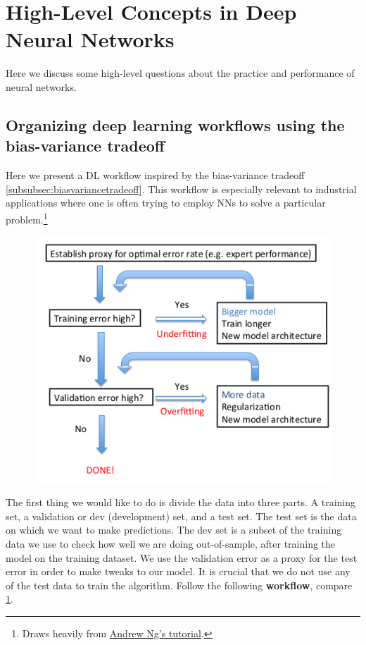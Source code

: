 \section{High-Level Concepts in Deep Neural Networks}
\label{sec:dnn2}
Here we discuss some high-level questions about the practice and performance of neural networks. 


\subsection{Organizing deep learning workflows using the bias-variance tradeoff}
\label{subsec:dnn2Workflow}
Here we present a DL workflow inspired by the bias-variance tradeoff \ref{subsubsec:biasvariancetradeoff}. This workflow is especially relevant to industrial applications where one is often trying to employ NNs to solve a particular problem.\footnote{Draws heavily from \href{https://www.youtube.com/watch?v=F1ka6a13S91}{Andrew Ng's tutorial}.}
\begin{figure}[h!]
	\centering
	\includegraphics[width=0.7\linewidth]{gfx/WorkflowDNN}
	\caption{}
	\label{fig:dnnworkflow}
\end{figure}
The first thing we would like to do is divide the data into three parts. A training set, a validation or dev (development) set, and a test set. The test set is the data on which we want to make predictions. The dev set is a subset of the training data we use to check how well we are doing out-of-sample, after training the model on the training dataset. We use the validation error as a proxy for the test error in order to make tweaks to our model. It is crucial that we do not use any of the test data to train the algorithm. Follow the following \textbf{workflow}, compare \ref{fig:dnnworkflow}.
